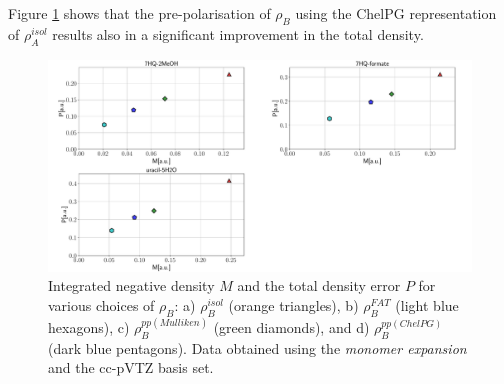 \documentclass[amsmath,amssymb,preprint,aip,jcp]{revtex4-1}
\begin{document}
Figure \ref{fig:M_vs_P} shows that the pre-polarisation of $\rho_B$ using the ChelPG representation of $\rho_A^{isol}$
results also in a significant improvement in the total density.
\begin{figure}
\centering
\includegraphics[width=1.0\linewidth]{M_vs_P_ccpVTZ.pdf}
\caption{Integrated negative density $M$ and the total density error $P$ for various choices of $\rho_B$: a) $\rho_B^{isol}$ (orange triangles), b) $\rho_B^{FAT}$ (light blue hexagons), c) $\rho_B^{pp(Mulliken)}$ (green diamonds), and d) $\rho_B^{pp(ChelPG)}$ (dark blue pentagons). Data obtained using the {\it monomer expansion} and the cc-pVTZ basis set.}
\label{fig:M_vs_P}
\end{figure}
\end{document}
